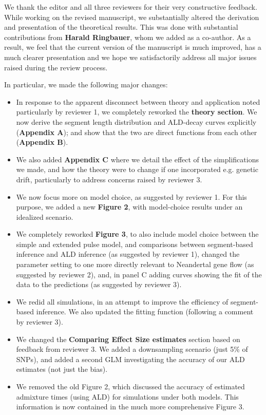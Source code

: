 \documentclass[11pt]{article}
\begin{document}
We thank the editor and all three reviewers for their very constructive feedback. While working on the revised manuscript, we substantially altered the derivation and presentation of the theoretical results. This was done with substantial contributions from \textbf{Harald Ringbauer}, whom we added as a co-author. As a result, we feel that the current version of the manuscript is much improved, has a much clearer presentation and  we hope we satisfactorily address all major issues raised during the review process.

In particular, we made the following major changes:
\begin{itemize}
    \item In response to the apparent disconnect between theory and application noted particularly by reviewer 1, we completely reworked the \textbf{theory section}. We now derive the segment length distribution and ALD-decay curves explicitly (\textbf{Appendix A}); and show that the two are direct functions from each other (\textbf{Appendix B}).
    \item We also added \textbf{Appendix C} where we detail the effect of the simplifications we made, and how the theory were to change if one incorporated e.g. genetic drift, particularly to address concerns raised by reviewer 3.
    \item We now focus more on model choice, as suggested by reviewer 1. For this purpose, we added a new \textbf{Figure 2}, with model-choice results under an idealized scenario. 
    \item We completely reworked \textbf{Figure 3}, to also include model choice between the simple and extended pulse model, and comparisons between segment-based inference and ALD inference (as suggested by reviewer 1), changed the parameter setting to one more directly relevant to Neandertal gene flow (as suggested by reviewer 2), and, in panel C adding curves showing the fit of the data to the predictions (as suggested by reviewer 3).
    \item We redid all simulations, in an attempt to improve the efficiency of segment-based inference. We also updated the fitting function (following a comment by reviewer 3).
    \item We changed the \textbf{Comparing Effect Size estimates} section based on feedback from reviewer 3. We added a downsampling scenario (just 5\% of SNPs), and added a second GLM investigating the accuracy of our ALD estimates (not just the bias). 
    \item We removed the old Figure 2, which discussed the accuracy of estimated admixture times (using ALD) for simulations under both models. This information is now contained in the much more comprehensive Figure 3. 
\end{itemize}
\end{document}
